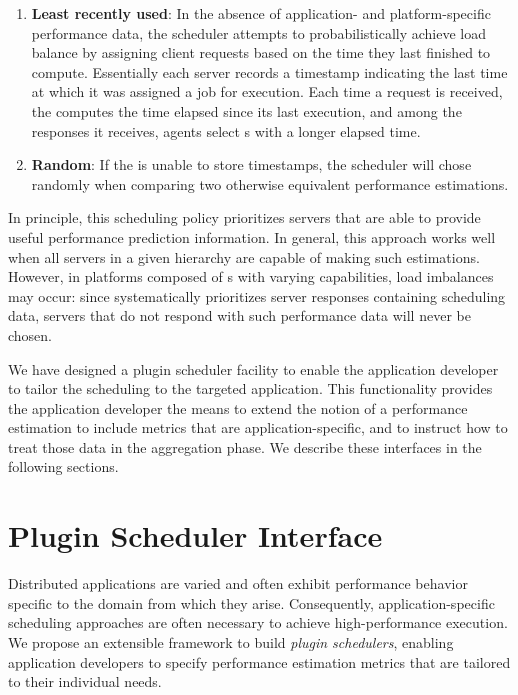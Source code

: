 \begin{enumerate}
\item \textbf{Least recently used}: In the absence of application- and
  platform-specific performance data, the \diet scheduler attempts to
  probabilistically achieve load balance by assigning client requests based on
  the time they last finished to compute.  Essentially each server records a
  timestamp indicating the last time at which it was assigned a job for
  execution.  Each time a request is received, the \sed computes the time elapsed
  since its last execution, and among the responses it receives, \diet agents
  select {\sed}s with a longer elapsed time.
\item \textbf{Random}: If the {\sed} is unable to store timestamps, the \diet
  scheduler will chose randomly when comparing two otherwise equivalent {\sed}
  performance estimations.
\end{enumerate}

In principle, this scheduling policy prioritizes servers that are able to
provide useful performance prediction information. 
In general, this approach works well when all servers in a
given \diet hierarchy are capable of making such estimations. However, in
platforms composed of {\sed}s with varying capabilities, load imbalances may
occur: since \diet systematically prioritizes server responses containing scheduling data,
servers that do not respond with such performance data will never be chosen.

We have designed a plugin scheduler facility to enable the application
developer to tailor the \diet scheduling to the targeted application. This
functionality provides the application developer the means to extend the notion
of a performance estimation to include metrics that are application-specific,
and to instruct \diet how to treat those data in the aggregation phase.  We
describe these interfaces in the following sections.


\section{Plugin Scheduler Interface}

Distributed applications are varied and often exhibit performance behavior
specific to the domain from which they arise. Consequently,
application-specific scheduling approaches are often necessary to achieve
high-performance execution. We propose an extensible framework to build
\emph{plugin schedulers}, enabling application developers to specify
performance estimation metrics that are tailored to their individual needs.

